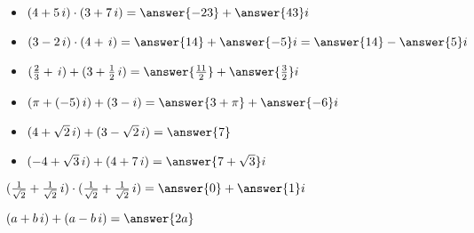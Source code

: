 \documentclass{ximera}
\begin{document}
\begin{question}


\begin{itemize}
\item   $(4 + 5 \, i) \cdot (3 + 7 \, i) = \answer{-23} + \answer{43} i$
\item   $(3 - 2 \, i) \cdot (4 + \, i) = \answer{14} + \answer{-5} i = \answer{14} - \answer{5} i$
\end{itemize}



\end{question}








\begin{question}


\begin{itemize}
\item   $(\frac{2}{3} +  \, i) + (3 + \frac{1}{2} \, i) = \answer{\frac{11}{2}} + \answer{\frac{3}{2}} i$
\item   $(\pi + (-5) \, i) + (3 - i) = \answer{3+\pi} + \answer{-6} i$
\item   $(4 + \sqrt{2} \, i) + (3 - \sqrt{2} \, i) = \answer{7}$
\item   $(-4 + \sqrt{3} \, i) + (4 + 7 \, i) = \answer{7 + \sqrt{3}} i$
\end{itemize}



\end{question}





\begin{question}


\item   $(\frac{1}{\sqrt{2}} +  \frac{1}{\sqrt{2}} \, i) \cdot (\frac{1}{\sqrt{2}} + \frac{1}{\sqrt{2}} \, i) = \answer{0} + \answer{1} i$


\end{question}










\begin{question}


\item   $(a +  b \, i) + (a - b \, i) = \answer{2a}$


\end{question}
\end{document}
